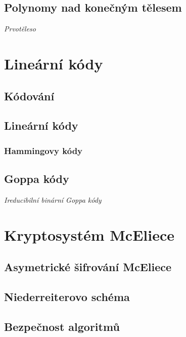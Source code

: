 \documentclass[thesis=M,czech,hidelinks]{FITthesis}[2012/06/26]
\newcommand{\0}{{\textcolor[gray]{0.100}{0}}}
\begin{document}
\section{Polynomy nad konečným tělesem}

\emph{Prvotěleso}


\chapter{Lineární kódy}\label{kap_kody}

\section{Kódování}

\section{Lineární kódy}
\subsection{Hammingovy kódy}

\section{Goppa kódy}
\emph{Ireducibilní binární Goppa kódy}




\chapter{Kryptosystém McEliece}\label{kap_mceliece}

\section{Asymetrické šifrování McEliece}

\section{Niederreiterovo schéma}

\section{Bezpečnost algoritmů}
\end{document}
